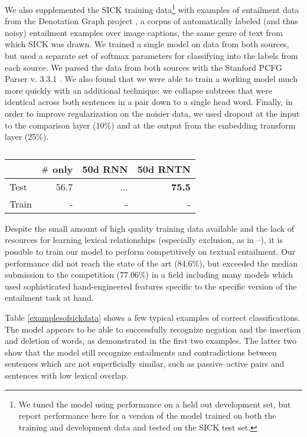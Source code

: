 We also supplemented the SICK training data\footnote{We tuned the model using performance on a held out development set, but report performance here for a version of the model trained on both the training and development data and tested on the SICK test set.} with  examples of entailment data from the Denotation Graph project \cite{hodoshimage}, a corpus of automatically labeled (and thus noisy) entailment examples over image captions, the same genre of text from which SICK was drawn. We trained a single model on data from both sources, but used a separate set of softmax parameters for classifying into the labels from each source. We parsed the data from both sources with the Stanford PCFG Parser v. 3.3.1 \cite{klein2003accurate}. We also found that we were able to train a working model much more quickly with an additional technique: we collapse subtrees that were identical across both sentences in a pair down to a single head word. Finally, in order to improve regularization on the noisier data, we used dropout \cite{hinton2012improving} at the input to the comparison layer (10\%) and at the output from the embedding transform layer (25\%). 

\begin{table}[tp]
  \centering \small
  \begin{tabular}{ l r@{ \ } r@{ \ } r@{ \ } }
    \toprule
    ~&\multicolumn{1}{c}{$\mathbin{\#}$ only} & \multicolumn{1}{c}{50d RNN}  & \multicolumn{1}{c}{50d RNTN}\\
    \midrule
    Test & 56.7 &	...& \textbf{75.5} \\
    Train &- &- &-  \\
    \bottomrule
  \end{tabular}
  \caption{}
  \label{sresultstable}
\end{table} 

Despite the small amount of high quality training data available and the lack of resources for learning lexical relationships (especially exclusion, as in --), it is possible to train our model to perform competitively on textual entailment. Our performance did not reach the state of the art (84.6\%), but exceeded the median submission to the competition (77.06\%) in a field including many models which used sophisticated hand-engineered features specific to the specific version of the entailment task at hand.

Table \ref{examplesofsickdata} shows a few typical examples of correct classifications. The model appears to be able to successfully recognize negation and the insertion and deletion of words, as demonstrated in the first two examples. The latter two show that the model still recognize entailments and contradictions between sentences which are not superficially similar, such as passive--active pairs and sentences with low lexical overlap.